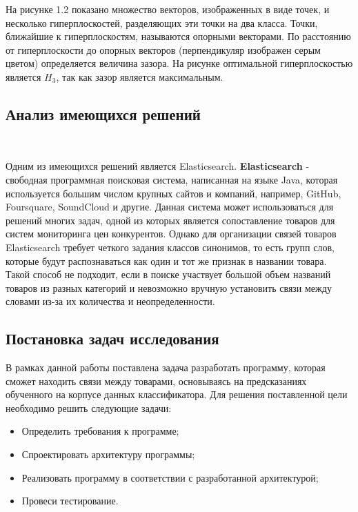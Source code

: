На рисунке 1.2 показано множество векторов, изображенных в виде точек, и несколько гиперплоскостей, разделяющих эти точки на два класса. Точки, ближайшие к гиперплоскостям, называются опорными векторами. По расстоянию от гиперплоскости до опорных векторов (перпендикуляр изображен серым цветом) определяется величина зазора. На рисунке оптимальной гиперплоскостью является $H_{3}$, так как зазор является максимальным.

\newpage
\subsection{Анализ имеющихся решений}
\

Одним из имеющихся решений является Elasticsearch. \textbf{Elasticsearch} - свободная программная поисковая система, написанная на языке Java, которая используется большим числом крупных сайтов и компаний, например, GitHub, Foursquare, SoundCloud и другие. Данная система может использоваться для решений многих задач, одной из которых является сопоставление товаров для систем мониторинга цен конкурентов.\cite{ELASTIC} Однако для организации связей товаров Elasticsearch требует четкого задания классов синонимов, то есть групп слов, которые будут распознаваться как один и тот же признак в названии товара. Такой способ не подходит, если в поиске участвует большой объем названий товаров из разных категорий и невозможно вручную установить связи между словами из-за их количества и неопределенности.

\newpage
\subsection{Постановка задач исследования}
В рамках данной работы поставлена задача разработать программу, которая сможет находить связи между товарами, основываясь на предсказаниях обученного на корпусе данных классификатора.
Для решения поставленной цели необходимо решить следующие задачи:
\begin{itemize}
  \item Определить требования к программе;
  \item Спроектировать архитектуру программы;
  \item Реализовать программу в соответствии с разработанной архитектурой;
  \item Провеси тестирование.
\end{itemize}
\newpage
